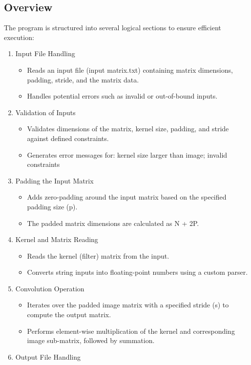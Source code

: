 \documentclass[a4paper]{article}
\begin{document}
\subsection{Overview}
The program is structured into several logical sections to ensure efficient execution:
\begin{enumerate}
	\item Input File Handling
	\begin{itemize}
		\item Reads an input file (input matrix.txt) containing matrix dimensions, padding,
		stride, and the matrix data.
		\item Handles potential errors such as invalid or out-of-bound inputs.
	\end{itemize}
	\item Validation of Inputs
	\begin{itemize}
		\item Validates dimensions of the matrix, kernel size, padding, and stride against
		defined constraints.
		\item Generates error messages for: kernel size larger than image; invalid constraints
	\end{itemize}
	\item Padding the Input Matrix
	\begin{itemize}
		\item Adds zero-padding around the input matrix based on the specified padding
		size (p).
		\item The padded matrix dimensions are calculated as N + 2P.
	\end{itemize}
	\item Kernel and Matrix Reading
	\begin{itemize}
		\item Reads the kernel (filter) matrix from the input.
		\item Converts string inputs into floating-point numbers using a custom parser.
	\end{itemize}
	\item Convolution Operation
	\begin{itemize}
		\item Iterates over the padded image matrix with a specified stride (s) to compute
		the output matrix.
		\item Performs element-wise multiplication of the kernel and corresponding image
		sub-matrix, followed by summation.
	\end{itemize}
	\item Output File Handling

\end{enumerate}
\end{document}

